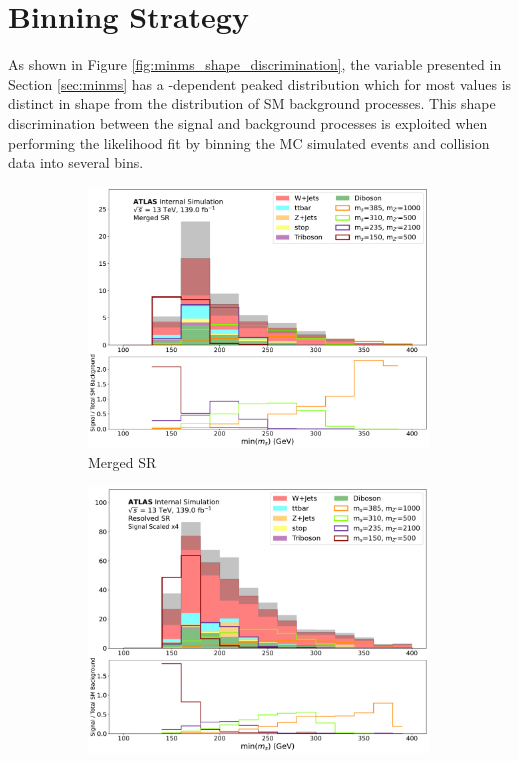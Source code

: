 \section{Binning Strategy}
\label{sec:binning_strategy}

As shown in Figure \ref{fig:minms_shape_discrimination}, the \minms variable presented in Section \ref{sec:minms} has a \ms-dependent peaked distribution which for most \ms values is distinct in shape from the distribution of SM background processes. This shape discrimination between the signal and background processes is exploited when performing the likelihood fit by binning the MC simulated events and collision data into several \minms bins. 

\begin{figure}[htbp]
  \centering
    \begin{subfigure}[t]{0.48\textwidth}
    \centering
     \includegraphics[width = 0.99\textwidth]{Figures/7/SR1L_Merged/TARJets10_minmS_mgd.pdf}
    \caption{Merged SR}
    \end{subfigure}
    \begin{subfigure}[t]{0.48\textwidth}
    \centering
     \includegraphics[width = 0.99\textwidth]{Figures/7/SR1L_Resolved/TARJets10_minmS_res.pdf}

\end{subfigure}
\end{figure}
